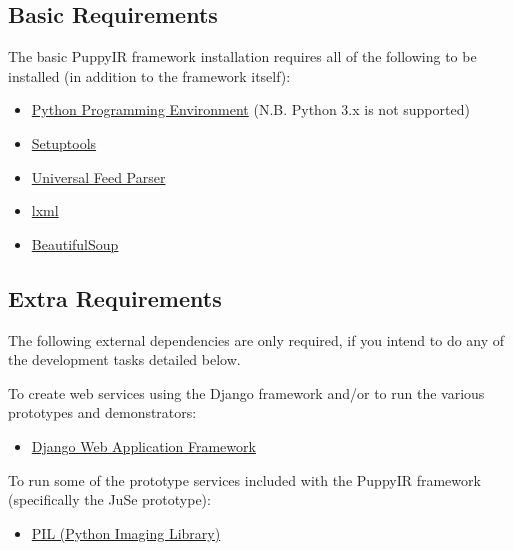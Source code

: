 \documentclass[letterpaper,10pt,english]{sphinxmanual}
\begin{document}
\subsection{Basic Requirements}
\label{installation:basic-requirements-label}\label{installation:basic-requirements}
The basic PuppyIR framework installation requires all of the following to be installed (in addition to the framework itself):
\begin{itemize}
\item {} 
\href{http://www.python.org/}{Python Programming Environment} (N.B. Python 3.x is not supported)

\item {} 
\href{http://pypi.python.org/pypi/setuptools}{Setuptools}

\item {} 
\href{http://code.google.com/p/feedparser/}{Universal Feed Parser}

\item {} 
\href{http://pypi.python.org/pypi/lxml/}{lxml}

\item {} 
\href{http://www.crummy.com/software/BeautifulSoup/\#Download}{BeautifulSoup}

\end{itemize}


\subsection{Extra Requirements}
\label{installation:extra-requirements-label}\label{installation:extra-requirements}
The following external dependencies are only required, if you intend to do any of the development tasks detailed below.

To create web services using the Django framework and/or to run the various prototypes and demonstrators:
\begin{itemize}
\item {} 
\href{https://www.djangoproject.com/}{Django Web Application Framework}

\end{itemize}

To run some of the prototype services included with the PuppyIR framework (specifically the JuSe prototype):
\begin{itemize}
\item {} 
\href{http://www.pythonware.com/products/pil/}{PIL (Python Imaging Library)}

\end{itemize}
\end{document}
